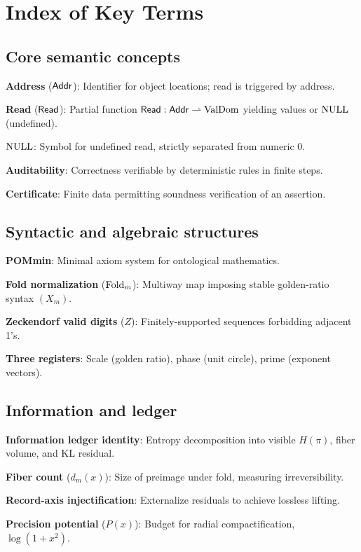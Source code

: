 \section{Index of Key Terms}

\subsection{Core semantic concepts}
\textbf{Address} ($\mathsf{Addr}$): Identifier for object locations; read is triggered by address.\par
\textbf{Read} ($\mathsf{Read}$): Partial function $\mathsf{Read}:\mathsf{Addr}\rightharpoonup \mathrm{ValDom}$ yielding values or $\mathrm{NULL}$ (undefined).\par
\textbf{$\mathrm{NULL}$}: Symbol for undefined read, strictly separated from numeric 0.\par
\textbf{Auditability}: Correctness verifiable by deterministic rules in finite steps.\par
\textbf{Certificate}: Finite data permitting soundness verification of an assertion.\par

\subsection{Syntactic and algebraic structures}
\textbf{POMmin}: Minimal axiom system for ontological mathematics.\par
\textbf{Fold normalization} ($\mathrm{Fold}_m$): Multiway map imposing stable golden-ratio syntax $(X_m)$.\par
\textbf{Zeckendorf valid digits} ($Z$): Finitely-supported sequences forbidding adjacent 1's.\par
\textbf{Three registers}: Scale (golden ratio), phase (unit circle), prime (exponent vectors).\par

\subsection{Information and ledger}
\textbf{Information ledger identity}: Entropy decomposition into visible $H(\pi)$, fiber volume, and KL residual.\par
\textbf{Fiber count} ($d_m(x)$): Size of preimage under fold, measuring irreversibility.\par
\textbf{Record-axis injectification}: Externalize residuals to achieve lossless lifting.\par
\textbf{Precision potential} ($P(x)$): Budget for radial compactification, $\log(1+x^2)$.\par

